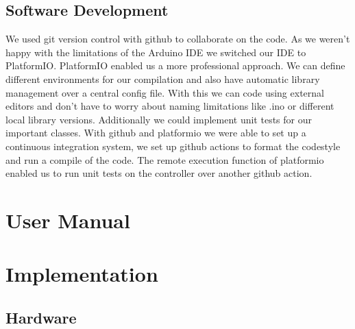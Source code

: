 \documentclass{article}
\begin{document}
\subsection{Software Development}
We used git version control with github to collaborate on the code.
As we weren't happy with the limitations of the Arduino IDE we switched our IDE to PlatformIO.
PlatformIO enabled us a more professional approach. We can define different environments for our compilation and also have automatic library management over a central config file.
With this we can code using external editors and don't have to worry about naming limitations like .ino or different local library versions. Additionally we could implement unit tests for our important classes.
With github and platformio we were able to set up a continuous integration system, we set up github actions to format the codestyle and run a compile of the code.
The remote execution function of platformio enabled us to run unit tests on the controller over another github action.

\section{User Manual}
\lipsum[1]\lipsum[1]
\section{Implementation}
\subsection{Hardware}
\end{document}
